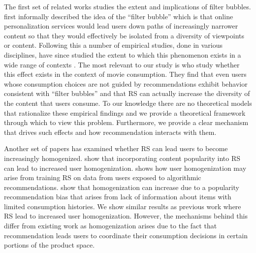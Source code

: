 \documentclass[manuscript]{acmart}
\newcommand{\xhdr}[1]{\vspace{1mm} \noindent{\bf #1}}
\begin{document}
\par
\xhdr{Related Work.} 
The first set of related works studies the extent and implications of filter bubbles. \cite{pariser2011filter} first informally described the idea of the ``filter bubble'' which is that online personalization services would lead users down paths of increasingly narrower content so that they would effectively be isolated from a diversity of viewpoints or content. Following this a number of empirical studies, done in various disciplines, have since studied the extent to which this phenomenon exists in a wide range of contexts \cite{flaxman2016filter,hosanagar2013will,moller2018blame,nguyen2014exploring}. The most relevant to our study is \cite{nguyen2014exploring} who study whether this effect exists in the context of movie consumption. They find that even users whose consumption choices are not guided by recommendations exhibit behavior consistent with ``filter bubbles'' and that RS can actually increase the diversity of the content that users consume. To our knowledge there are no theoretical models that rationalize these empirical findings and we provide a theoretical framework through which to view this problem. Furthermore, we provide a clear mechanism that drives such effects and how recommendation interacts with them.
\par 
Another set of papers has examined whether RS can lead users to become increasingly homogenized. \cite{celma2008hits, treviranus2009value} show that incorporating content popularity into RS can lead to increased user homogenization. \cite{chaney2018algorithmic} shows how user homogenization may arise from training RS on data from users exposed to algorithmic recommendations. \cite{fleder2009blockbuster} show that homogenization can increase due to a popularity recommendation bias that arises from lack of information about items with limited consumption histories. We show similar results as previous work where RS lead to increased user homogenization. However, the mechanisms behind this differ from existing work as homogenization arises due to the fact that recommendation leads users to coordinate their consumption decisions in certain portions of the product space.
\par
\end{document}
